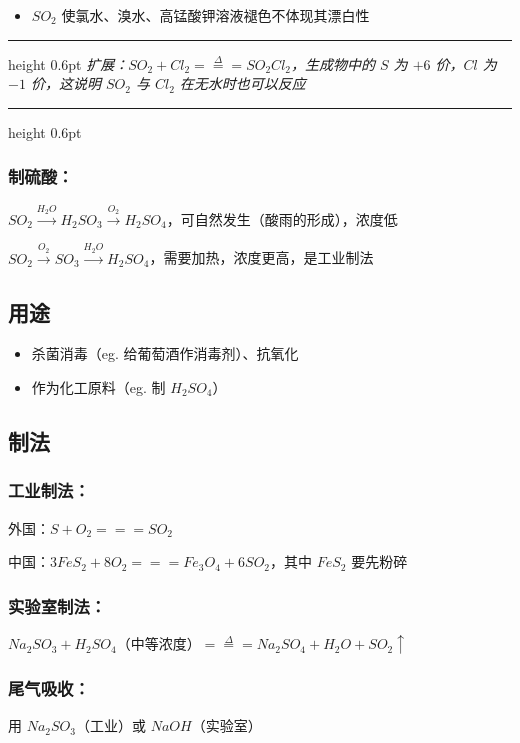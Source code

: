 \documentclass[UTF8,zihao=-4,openany]{ctexbook}
\newenvironment{notebox}
  {\par\smallskip\noindent\begingroup\begin{minipage}{\linewidth}\color{noteframe}\hrule height 0.6pt\smallskip\color{black}\itshape}
  {\par\smallskip\color{noteframe}\hrule height 0.6pt\end{minipage}\endgroup\par\smallskip}
\begin{document}
\begin{itemize}
\item $SO_2$ 使氯水、溴水、高锰酸钾溶液褪色不体现其漂白性
\end{itemize}

\begin{notebox}
扩展：$SO_2+Cl_2\stackrel{\Delta}{=\!=\!=}SO_2Cl_2$，生成物中的 $S$ 为 $+6$ 价，$Cl$ 为 $-1$ 价，这说明 $SO_2$ 与 $Cl_2$ 在无水时也可以反应\par
\end{notebox}
\subsubsection{制硫酸：}
$SO_2\stackrel{H_2O}{\longrightarrow}H_2SO_3\stackrel{O_2}{\longrightarrow}H_2SO_4$，可自然发生（酸雨的形成），浓度低\par

$SO_2\stackrel{O_2}{\longrightarrow}SO_3\stackrel{H_2O}{\longrightarrow}H_2SO_4$，需要加热，浓度更高，是工业制法\par
\subsection{用途}
\begin{itemize}
\item 杀菌消毒（eg. 给葡萄酒作消毒剂）、抗氧化
\end{itemize}

\begin{itemize}
\item 作为化工原料（eg. 制 $H_2SO_4$）
\end{itemize}
\subsection{制法}
\subsubsection{工业制法：}
外国：$S+O_2=\!=\!=SO_2$\par

中国：$3FeS_2+8O_2=\!=\!=Fe_3O_4+6SO_2$，其中 $FeS_2$ 要先粉碎\par
\subsubsection{实验室制法：}
$Na_2SO_3+H_2SO_4$（中等浓度）$\stackrel{\Delta}{=\!=\!=}Na_2SO_4+H_2O+SO_2\uparrow$\par
\subsubsection{尾气吸收：}
用 $Na_2SO_3$（工业）或 $NaOH$（实验室）\par
\end{document}
